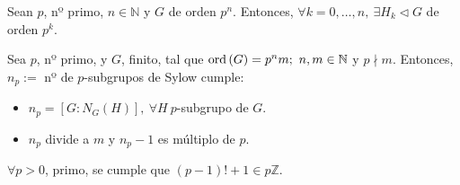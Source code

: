 \begin{coro}
Sean $p$, nº primo, $n \in \mathbb{N}$ y $G$ de orden $p^n$. Entonces, $\forall k = 0, \ldots, n,\ \exists H_k \triangleleft G$ de orden $p^k$.
\end{coro}

\begin{theo}
Sea $p$, nº primo, y $G$, finito, tal que $\operatorname{ord} \left( G \right) = p^nm;\ n, m \in \mathbb{N}$ y $p \nmid m$. Entonces, $n_p :=$ nº de $p$-subgrupos de Sylow cumple:
\begin{itemize}
    \item $n_p = \left[ G : N_G\left( H \right) \right],\ \forall H\ p$-subgrupo de $G$. 
    \item $n_p$ divide a $m$ y $n_p - 1$ es múltiplo de $p$.
\end{itemize}
\end{theo}

\begin{coro}
$\forall p > 0$, primo, se cumple que $\left( p - 1 \right)! + 1 \in p \mathbb{Z}$.
\end{coro}
